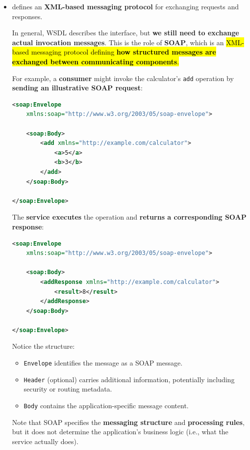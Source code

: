 \begin{itemize}
        \newpage

    \item {} defines an \textbf{XML-based messaging protocol} for exchanging requests and responses.

        In general, WSDL describes the interface, but \textbf{we still need to exchange actual invocation messages}. This is the role of \textbf{SOAP}, which is an \hl{XML-based messaging protocol defining \textbf{how structured messages are exchanged between communicating components}.}

        \begin{examplebox}
            For example, a \textbf{consumer} might invoke the calculator's \texttt{add} operation by \textbf{sending an illustrative SOAP request}:
\begin{lstlisting}[language=xml]
<soap:Envelope
    xmlns:soap="http://www.w3.org/2003/05/soap-envelope">

    <soap:Body>
        <add xmlns="http://example.com/calculator">
            <a>5</a>
            <b>3</b>
        </add>
    </soap:Body>

</soap:Envelope>
\end{lstlisting}
            The \textbf{service executes} the operation and \textbf{returns a corresponding SOAP response}:
\begin{lstlisting}[language=xml]
<soap:Envelope
    xmlns:soap="http://www.w3.org/2003/05/soap-envelope">

    <soap:Body>
        <addResponse xmlns="http://example.com/calculator">
            <result>8</result>
        </addResponse>
    </soap:Body>

</soap:Envelope>
\end{lstlisting}
            Notice the structure:
            \begin{itemize}
                \item \texttt{Envelope} identifies the message as a SOAP message.
                \item \texttt{Header} (optional) carries additional information, potentially including security or routing metadata.
                \item \texttt{Body} contains the application-specific message content.
            \end{itemize}
            Note that SOAP specifies the \textbf{messaging structure} and \textbf{processing rules}, but it does not determine the application's business logic (i.e., what the service actually does).
        \end{examplebox}


\end{itemize}

